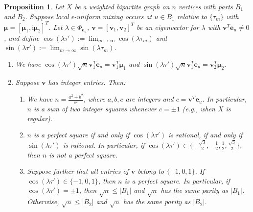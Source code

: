 \documentclass[11pt]{article}
\newtheorem{proposition}{Proposition}
\newcommand{\be}{\mathbf e}
\newcommand{\bv}{\mathbf v}
\newcommand{\bmu}{{\boldsymbol{\mu}}}
\def\ii{\mathrm{i}}
\newcommand{\supp}{{\Phi}}
\begin{document}
\begin{proposition}
\label{prop7}
Let $X$ be a weighted bipartite graph on $n$ vertices with parts $B_1$ and $B_2$. Suppose local $\epsilon$-uniform mixing occurs at $u\in B_1$ relative to $\{\tau_m\}$ with $\bmu=[\bmu_1,\ii\bmu_2]^T$. Let $\lambda\in\supp_{\be_u}$, $\bv=[\bv_1,\bv_2]^T$ be an eigenvector for $\lambda$ with $\bv^T\be_u\neq 0$, and define 
$\cos(\lambda\tau'):=\displaystyle\lim_{m\rightarrow\infty}\cos(\lambda\tau_m)$ and $\sin(\lambda\tau'):=\displaystyle\lim_{m\rightarrow\infty}\sin(\lambda\tau_m)$.
\begin{enumerate}
\item We have $\cos(\lambda\tau')\sqrt{n}\bv_1^T\be_u=\bv_1^T\bmu_1$ and $\sin(\lambda\tau')\sqrt{n}\bv_1^T\be_u=\bv_2^T\bmu_2.$ 
\item Suppose $\bv$ has integer entries. Then:
\begin{enumerate}
\item We have $n=\frac{a^2+b^2}{c^2}$, where $a,b,c$ are integers and $c=\bv^T\be_u$. In particular, $n$ is a sum of two integer squares whenever $c=\pm 1$ (e.g., when $X$ is regular).
\item $n$ is a perfect square if and only if $\cos(\lambda\tau')$ is rational, if and only if $\sin(\lambda\tau')$ is rational. In particular, if $\cos(\lambda\tau')\in\{-\frac{\sqrt{3}}{2},-\frac{1}{2},\frac{1}{2},\frac{\sqrt{3}}{2}\}$, then $n$ is not a perfect square.
\item Suppose further that all entries of $\bv$ belong to $\{-1,0,1\}$. If $\cos(\lambda\tau')\in\{-1,0,1\}$, then $n$ is a perfect square. In particular, if $\cos(\lambda\tau')=\pm 1$, then $\sqrt{n}\leq |B_1|$ and $\sqrt{n}$ has the same parity as $|B_1|$. Otherwise, $\sqrt{n}\leq |B_2|$ and $\sqrt{n}$ has the same parity as $|B_2|$. 
\end{enumerate}
\end{enumerate}
\end{proposition}
\end{document}
